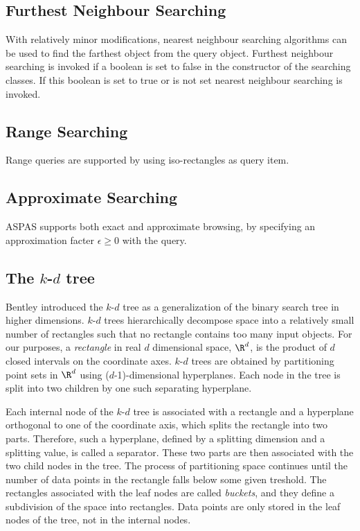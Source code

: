 \subsection{Furthest Neighbour Searching}

With relatively minor modifications, nearest neighbour searching algorithms can be
used to find the farthest object from the query object. Furthest neighbour searching is invoked if
a boolean  is set to false in the constructor of the searching classes.
If this boolean is set to true or is not set nearest neighbour searching is invoked.

\subsection{Range Searching}

Range queries are supported by using iso-rectangles as query item.

\subsection{Approximate Searching}

ASPAS supports both exact and approximate browsing, by
specifying an approximation facter $\epsilon \geq 0$ with the query.

\subsection{The $k$-$d$ tree}

Bentley \cite{b-mbstu-75} introduced the $k$-$d$ tree as a generalization of the binary
search tree in higher dimensions. $k$-$d$ trees hierarchically decompose space into a
relatively small number of rectangles such that no rectangle contains too many input objects.
For our purposes, a {\it rectangle} in real $d$ dimensional space, $\R^d$, is the product of $d$ closed
intervals on the coordinate axes.
$k$-$d$ trees are obtained by partitioning point sets in $\R^d$ using
($d$-1)-dimensional hyperplanes.
Each node in the tree is split into two children by one such separating hyperplane.

Each internal node of the $k$-$d$ tree is associated with a rectangle
and a hyperplane orthogonal to
one of the coordinate axis, which splits the rectangle into two parts.
Therefore, such a hyperplane, defined by a splitting dimension
and a splitting value, is called a separator.
These two parts are then associated
with the two child nodes in the tree. The process of partitioning space continues until the number of data
points in the rectangle falls below some given treshold. The rectangles associated with the leaf nodes
are called {\it buckets}, and they define a subdivision of the space into rectangles.
Data points are only stored in the leaf nodes of the tree, not in the internal nodes.


